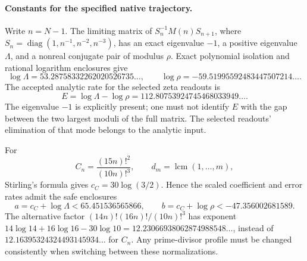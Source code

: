 \paragraph{Constants for the specified native trajectory.}
Write $n=N-1$. The limiting matrix of
$S_n^{-1}M(n)S_{n+1}$, where
$S_n=\operatorname{diag}(1,n^{-1},n^{-2},n^{-3})$, has an exact eigenvalue
$-1$, a positive eigenvalue $\Lambda$, and a nonreal conjugate pair of
modulus $\rho$. Exact polynomial isolation and rational logarithm enclosures give
\[
 \log\Lambda=53.28758332262020526735\ldots,\qquad
 \log\rho=-59.51995592483447507214\ldots .
\]
The accepted analytic rate for the selected zeta readouts is
\[
 E=\log\Lambda-\log\rho
   =112.80753924745468033949\ldots .
\]
The eigenvalue $-1$ is explicitly present; one must not identify $E$ with
the gap between the two largest moduli of the full matrix. The selected
readouts' elimination of that mode belongs to the analytic input.

For
\[
 C_n=\frac{(15n)!^2}{(10n)!^3},\qquad d_m=\operatorname{lcm}(1,\ldots,m),
\]
Stirling's formula gives $c_C=30\log(3/2)$. Hence the scaled coefficient
and error rates admit the safe enclosures
\[
 a=c_C+\log\Lambda<65.451536565866,\qquad
 b=c_C+\log\rho<-47.356002681589.
\]
The alternative factor $(14n)!(16n)!/(10n)!^3$ has exponent
$14\log14+16\log16-30\log10=12.23066938062874988548\ldots$,
instead of $12.16395324324493145934\ldots$ for $C_n$.
Any prime-divisor profile must be changed consistently when switching
between these normalizations.

